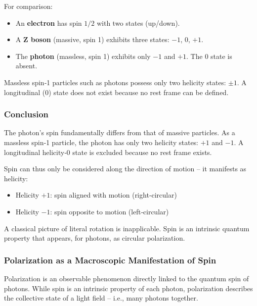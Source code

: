 \newpage
\noindent
For comparison:
\begin{itemize}
	\item An \textbf{electron} has spin $1/2$ with two states (up/down).
	\item A \textbf{Z boson} (massive, spin 1) exhibits three states: $-1$, $0$, $+1$.
	\item The \textbf{photon} (massless, spin 1) exhibits only $-1$ and $+1$. The $0$ state is absent.
\end{itemize}
\vspace{1em}
\begin{tcolorbox}[physikbox, title=Didactic Rule of Thumb]
	\label{box:didaktischerMerksatz}
	Massless spin‑1 particles such as photons possess only two helicity states: \textbf{$\pm1$}. A longitudinal ($0$) state does not exist because no rest frame can be defined.
\end{tcolorbox}
\vspace{1em}

\subsubsection*{Conclusion}
The photon’s spin fundamentally differs from that of massive particles. As a massless spin‑1 particle, the photon has only two helicity states: $+1$ and $-1$. A longitudinal helicity‑0 state is excluded because no rest frame exists.

\vspace{0.5em}
Spin can thus only be considered along the direction of motion – it manifests as helicity:
\begin{itemize}
	\item Helicity $+1$: spin aligned with motion (right‑circular)
	\item Helicity $-1$: spin opposite to motion (left‑circular)
\end{itemize}
A classical picture of literal rotation is inapplicable. Spin is an intrinsic quantum property that appears, for photons, as circular polarization.

\subsubsection{Polarization as a Macroscopic Manifestation of Spin}

Polarization is an observable phenomenon directly linked to the quantum spin of photons. While spin is an intrinsic property of each photon, polarization describes the collective state of a light field – i.e., many photons together.

